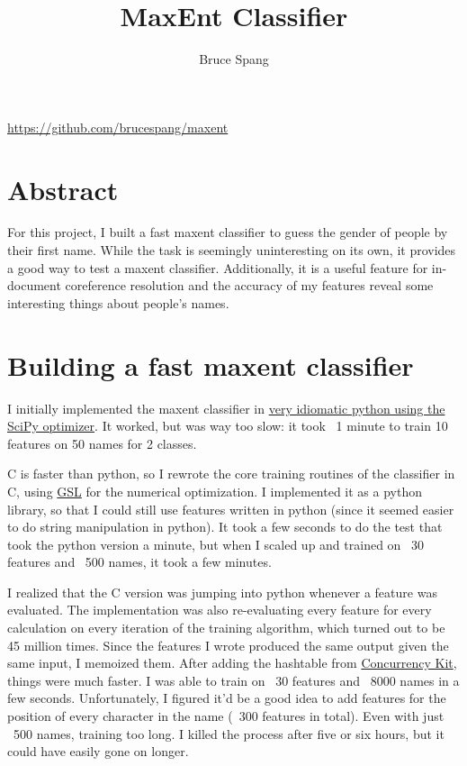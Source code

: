 \documentclass{article}
\begin{document}
\title{MaxEnt Classifier}
\author{Bruce Spang}
\maketitle

\centerline{\url{https://github.com/brucespang/maxent}}

\section{Abstract}

For this project, I built a fast maxent classifier to guess the gender of people by their first name. While the task is seemingly uninteresting on its own, it provides a good way to test a maxent classifier. Additionally, it is a useful feature for in-document coreference resolution and the accuracy of my features reveal some interesting things about people's names.

\section{Building a fast maxent classifier}

I initially implemented the maxent classifier in \href{https://github.com/brucespang/maxent/blob/6a751047e29b935a482a535b67e30197904bc3a9/maxent.py}{very idiomatic python using the SciPy optimizer}. It worked, but was way too slow: it took ~1 minute to train 10 features on 50 names for 2 classes.

C is faster than python, so I rewrote the core training routines of the classifier in C, using \href{http://www.gnu.org/software/gsl/}{GSL} for the numerical optimization. I implemented it as a python library, so that I could still use features written in python (since it seemed easier to do string manipulation in python). It took a few seconds to do the test that took the python version a minute, but when I scaled up and trained on ~30 features and ~500 names, it took a few minutes.

I realized that the C version was jumping into python whenever a feature was evaluated. The implementation was also re-evaluating every feature for every calculation on every iteration of the training algorithm, which turned out to be 45 million times. Since the features I wrote produced the same output given the same input, I memoized them. After adding the hashtable from \href{http://concurrencykit.org/}{Concurrency Kit}, things were much faster. I was able to train on ~30 features and ~8000 names in a few seconds. Unfortunately, I figured it'd be a good idea to add features for the position of every character in the name (~300 features in total). Even with just ~500 names, training too long. I killed the process after five or six hours, but it could have easily gone on longer.
\end{document}
